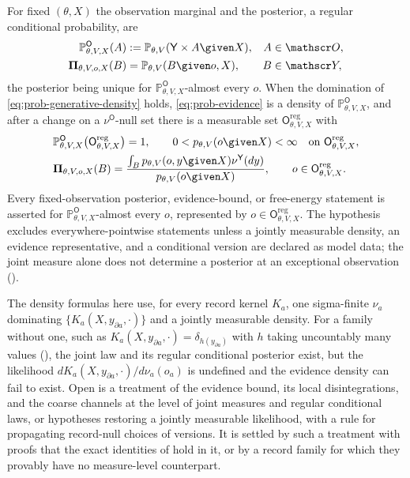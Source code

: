 For fixed $(\theta,X)$ the observation marginal and the posterior, a regular conditional probability, are
\begin{align}
\mathbb P_{\theta,V,X}^{\mathsf O}(A)&:=\mathbb P_{\theta,V}(\mathsf Y\times A\given X),
&A&\in\mathscr O,
\label{eq:prob-observation-marginal}\\
\boldsymbol\Pi_{\theta,V,o,X}(B)&=\mathbb P_{\theta,V}(B\given o,X),
&B&\in\mathscr Y,
\label{eq:prob-rcp}
\end{align}
the posterior being unique for $\mathbb P_{\theta,V,X}^{\mathsf O}$-almost every $o$. When the domination of
\eqref{eq:prob-generative-density} holds, \eqref{eq:prob-evidence} is a density of
$\mathbb P_{\theta,V,X}^{\mathsf O}$, and after a change on a $\nu^{\mathsf O}$-null set there is a
measurable set $\mathsf O_{\theta,V,X}^{\mathrm{reg}}$ with
\begin{align}
&\mathbb P_{\theta,V,X}^{\mathsf O}\bigl(\mathsf O_{\theta,V,X}^{\mathrm{reg}}\bigr)=1,
\qquad
0<p_{\theta,V}(o\given X)<\infty
\quad\text{on }\mathsf O_{\theta,V,X}^{\mathrm{reg}},
\label{eq:prob-regular-observations}\\
&\boldsymbol\Pi_{\theta,V,o,X}(B)
=\frac{\int_Bp_{\theta,V}(o,y\given X)\nu^{\mathsf Y}(dy)}{p_{\theta,V}(o\given X)},
\qquad o\in\mathsf O_{\theta,V,X}^{\mathrm{reg}}.
\label{eq:prob-rcp-density}
\end{align}
Every fixed-observation posterior, evidence-bound, or free-energy statement is asserted for
$\mathbb P_{\theta,V,X}^{\mathsf O}$-almost every $o$, represented by
$o\in\mathsf O_{\theta,V,X}^{\mathrm{reg}}$. The hypothesis excludes everywhere-pointwise statements
unless a jointly measurable density, an evidence representative, and a conditional version are declared
as model data; the joint measure alone does not determine a posterior at an exceptional observation
().

The density formulas here use, for every record kernel $K_a$, one sigma-finite $\nu_a$ dominating
$\{K_a(X,y_{\partial a},\cdot)\}$ and a jointly measurable density. For a family without one, such as
$K_a(X,y_{\partial a},\cdot)=\delta_{h(y_{\partial a})}$ with $h$ taking uncountably many values
(), the joint law and its regular conditional posterior exist, but the
likelihood $dK_a(X,y_{\partial a},\cdot)/d\nu_a(o_a)$ is undefined and the evidence density can fail to
exist. Open is a treatment of the evidence bound, its local disintegrations, and the coarse channels at the
level of joint measures and regular conditional laws, or hypotheses restoring a jointly measurable
likelihood, with a rule for propagating record-null choices of versions. It is settled by such a treatment
with proofs that the exact identities of  hold in it, or by a record family
for which they provably have no measure-level counterpart.

